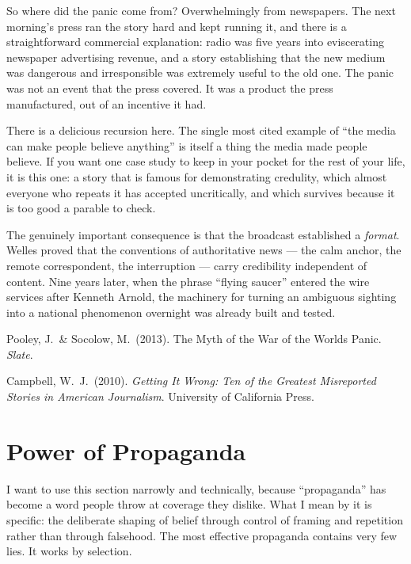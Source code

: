 So where did the panic come from? Overwhelmingly from newspapers. The next morning's press ran the
story hard and kept running it, and there is a straightforward commercial explanation: radio was
five years into eviscerating newspaper advertising revenue, and a story establishing that the new
medium was dangerous and irresponsible was extremely useful to the old one. The panic was not an
event that the press covered. It was a product the press manufactured, out of an incentive it had.

\begin{funfact}
There is a delicious recursion here. The single most cited example of ``the media can make people
believe anything'' is itself a thing the media made people believe. If you want one case study to
keep in your pocket for the rest of your life, it is this one: a story that is famous for
demonstrating credulity, which almost everyone who repeats it has accepted uncritically, and which
survives because it is too good a parable to check.
\end{funfact}

The genuinely important consequence is that the broadcast established a \emph{format}. Welles proved
that the conventions of authoritative news --- the calm anchor, the remote correspondent, the
interruption --- carry credibility independent of content. Nine years later, when the phrase ``flying
saucer'' entered the wire services after Kenneth Arnold, the machinery for turning an ambiguous
sighting into a national phenomenon overnight was already built and tested.

\begin{srcnotes}
\item Pooley, J.\ \& Socolow, M.\ (2013). The Myth of the War of the Worlds Panic. \emph{Slate}.
\item Campbell, W.\ J.\ (2010). \emph{Getting It Wrong: Ten of the Greatest Misreported Stories in
American Journalism}. University of California Press.
\end{srcnotes}

\section{Power of Propaganda}\label{sec:powerpropaganda}

I want to use this section narrowly and technically, because ``propaganda'' has become a word people
throw at coverage they dislike. What I mean by it is specific: the deliberate shaping of belief
through control of framing and repetition rather than through falsehood. The most effective
propaganda contains very few lies. It works by selection.

